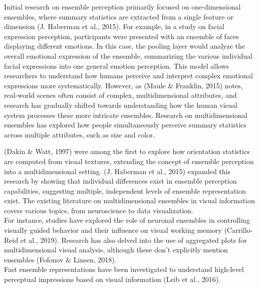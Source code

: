 \documentclass[print]{nuthesis}
\begin{document}
Initial research on ensemble perception primarily focused on one-dimensional ensembles, where summary statistics are extracted from a single feature or dimension (J. Haberman et al., 2015).
For example, in a study on facial expression perception, participants were presented with an ensemble of faces displaying different emotions.
In this case, the pooling layer would analyze the overall emotional expression of the ensemble, summarizing the various individual facial expressions into one general emotion perception.
This model allows researchers to understand how humans perceive and interpret complex emotional expressions more systematically.
However, as (Maule \& Franklin, 2015) notes, real-world scenes often consist of complex, multidimensional attributes, and research has gradually shifted towards understanding how the human visual system processes these more intricate ensembles.
Research on multidimensional ensembles has explored how people simultaneously perceive summary statistics across multiple attributes, such as size and color.

(Dakin \& Watt, 1997) were among the first to explore how orientation statistics are computed from visual textures, extending the concept of ensemble perception into a multidimensional setting.
(J. Haberman et al., 2015) expanded this research by showing that individual differences exist in ensemble perception capabilities, suggesting multiple, independent levels of ensemble representation exist.
The existing literature on multidimensional ensembles in visual information covers various topics, from neuroscience to data visualization.\\
For instance, studies have explored the role of neuronal ensembles in controlling visually guided behavior and their influence on visual working memory (Carrillo-Reid et al., 2019).
Research has also delved into the use of aggregated plots for multidimensional visual analysis, although these don't explicitly mention ensembles (Fofonov \& Linsen, 2018).\\
Fast ensemble representations have been investigated to understand high-level perceptual impressions based on visual information (Leib et al., 2016).
\end{document}
